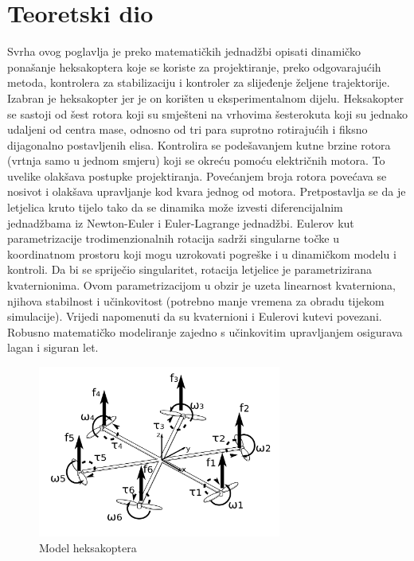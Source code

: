 \documentclass[times, utf8, diplomski]{fer}
\begin{document}
\section{Teoretski dio}\label{sec:SimulacijskiDio}
Svrha ovog poglavlja je preko matematičkih jednadžbi opisati dinamičko ponašanje heksakoptera koje se koriste za projektiranje, preko odgovarajućih metoda, kontrolera  za stabilizaciju i kontroler za slijeđenje željene trajektorije. Izabran je heksakopter jer je on korišten u eksperimentalnom dijelu. Heksakopter se sastoji od šest rotora koji su smješteni na vrhovima šesterokuta koji su jednako udaljeni od centra mase, odnosno od tri para suprotno rotirajućih i fiksno dijagonalno postavljenih elisa.  Kontrolira se podešavanjem kutne brzine rotora (vrtnja samo u jednom smjeru) koji se okreću pomoću električnih motora. To uvelike olakšava postupke projektiranja. Povećanjem broja rotora povećava se nosivot i olakšava upravljanje kod kvara jednog od motora. Pretpostavlja se da je letjelica kruto tijelo tako da se dinamika može izvesti diferencijalnim jednadžbama iz Newton-Euler i Euler-Lagrange jednadžbi. Eulerov kut parametrizacije trodimenzionalnih rotacija sadrži singularne točke u koordinatnom prostoru koji mogu uzrokovati pogreške i u dinamičkom modelu i kontroli. Da bi se spriječio singularitet, rotacija letjelice je parametrizirana kvaternionima. Ovom parametrizacijom u obzir je uzeta linearnost kvaterniona, njihova stabilnost i učinkovitost (potrebno manje vremena za obradu tijekom simulacije). Vrijedi napomenuti da su kvaternioni i Eulerovi kutevi povezani. Robusno matematičko modeliranje zajedno s učinkovitim upravljanjem osigurava lagan i siguran let. \citep{MathematicalModeling}
\begin{figure}[htb]
\centering
\includegraphics[width=8cm]{img/model_hexcopter.png}
\caption{Model heksakoptera\protect\footnotemark}
\label{fig:model}
\end{figure}
\end{document}
